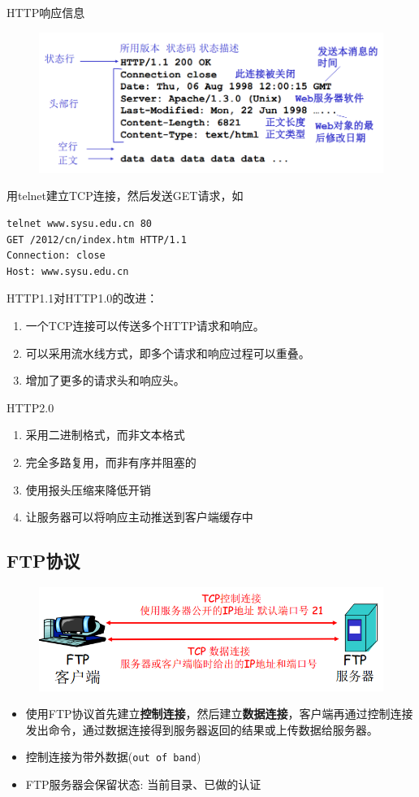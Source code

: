HTTP响应信息
\begin{figure}[H]
    \centering
    \includegraphics[width=0.6\linewidth]{fig/http-respond.png}
\end{figure}

用telnet建立TCP连接，然后发送GET请求，如
\begin{lstlisting}
telnet www.sysu.edu.cn 80
GET /2012/cn/index.htm HTTP/1.1
Connection: close
Host: www.sysu.edu.cn
\end{lstlisting}

HTTP1.1对HTTP1.0的改进：
\begin{enumerate}
\item 一个TCP连接可以传送多个HTTP请求和响应。
\item 可以采用流水线方式，即多个请求和响应过程可以重叠。
\item 增加了更多的请求头和响应头。
\end{enumerate}

HTTP2.0
\begin{enumerate}
\item 采用二进制格式，而非文本格式
\item 完全多路复用，而非有序并阻塞的
\item 使用报头压缩来降低开销
\item 让服务器可以将响应主动推送到客户端缓存中
\end{enumerate}

\subsection{FTP协议}
\begin{figure}[H]
\centering
\includegraphics[width=0.8\linewidth]{fig/FTP.png}
\end{figure}

\begin{itemize}
\item 使用FTP协议首先建立\textbf{控制连接}，然后建立\textbf{数据连接}，客户端再通过控制连接发出命令，通过数据连接得到服务器返回的结果或上传数据给服务器。
\item 控制连接为带外数据(\verb'out of band')
\item FTP服务器会保留状态: 当前目录、已做的认证
\end{itemize}


